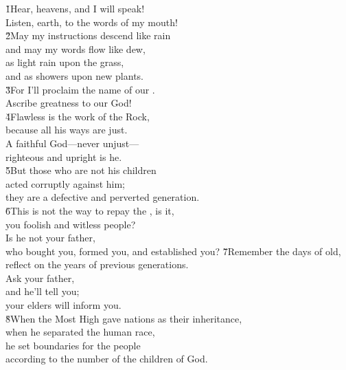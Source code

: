 \begin{poetry}
\poeml {}
\v{1}Hear, heavens, and I will speak! \\
\poemll    Listen, earth, to the words of my mouth! \\
\poeml \v{2}May my instructions descend like rain \\
\poemll    and may my words flow like dew, \\
\poeml as light rain upon the grass, \\
\poemll    and as showers upon new plants. \\
\poeml \v{3}For I'll proclaim the name of our . \\
\poemll    Ascribe greatness to our God! \\
\poeml \v{4}Flawless is the work of the Rock, \\
\poemll    because all his ways are just. \\
\poeml A faithful God---never unjust--- \\
\poemll    righteous and upright is he. \\
\poeml \v{5}But those who are not his children \\
\poemll    acted corruptly against him; \\
\poemlll       they are a defective and perverted generation. \\
\poeml \v{6}This is not the way to repay the , is it, \\
\poemll    you foolish and witless people? \\
\poeml Is he not your father, \\
\poemll    who bought you, formed you, and established you?
\poeml \v{7}Remember the days of old, \\
\poemll    reflect on the years of previous generations. \\
\poeml Ask your father, \\
\poemll    and he'll tell you; \\
\poemlll       your elders will inform you. \\
\poeml \v{8}When the Most High gave nations as their inheritance, \\
\poemll    when he separated the human race, \\
\poeml he set boundaries for the people \\
\poemll    according to the number of the children of God. \\

\end{poetry}
